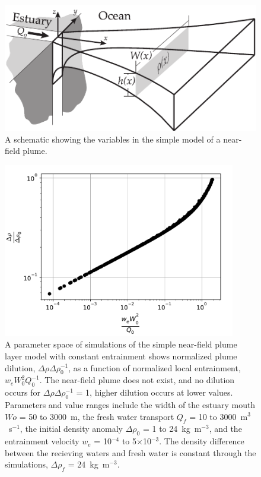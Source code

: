 \documentclass[12pt]{article}
\begin{document}



\clearpage
\listoffigures

\begin{figure}[p]
    \centering
    \includegraphics[width=5in]{Figures/plume_vars_flat.pdf}
    \caption{A schematic showing the variables in the simple model of a near-field plume.}
    \label{fig:plume_vars}
\end{figure}

\begin{figure}[p]
    \centering
    \includegraphics[width=4in]{Figures/plume_dilution.pdf}
    \caption{A parameter space of simulations of the simple near-field plume layer model with constant entrainment shows normalized plume dilution, $\Delta\rho \Delta\rho_0^{-1}$, as a function of normalized local entrainment, $w_e W_0^2 Q_0^{-1}$. The near-field plume does not exist, and no dilution occurs for $\Delta\rho \Delta\rho_0^{-1}$ = 1, higher dilution occurs at lower values. Parameters and value ranges include the width of the estuary mouth $Wo$ = 50 to 3000~m, the fresh water transport $Q_f$ = 10 to 3000~m$^3$~s$^{-1}$, the initial density anomaly $\Delta\rho_0$ = 1 to 24~kg~m$^{-3}$, and the entrainment velocity $w_e$ = 10$^{-4}$ to 5$\times$10$^{-3}$. The density difference between the recieving waters and fresh water is constant through the simulations, $\Delta\rho_f$ = 24~kg~m$^{-3}$.}
    \label{fig:dilution}
\end{figure}
\end{document}
